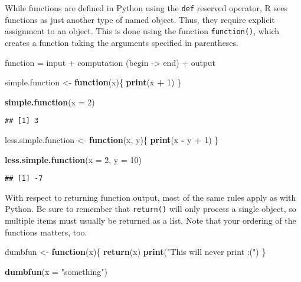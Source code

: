 \documentclass[
]{book}
\newenvironment{Shaded}{\begin{snugshade}}{\end{snugshade}}
\newcommand{\ControlFlowTok}[1]{\textcolor[rgb]{0.13,0.29,0.53}{\textbf{#1}}}
\newcommand{\DataTypeTok}[1]{\textcolor[rgb]{0.13,0.29,0.53}{#1}}
\newcommand{\DecValTok}[1]{\textcolor[rgb]{0.00,0.00,0.81}{#1}}
\newcommand{\KeywordTok}[1]{\textcolor[rgb]{0.13,0.29,0.53}{\textbf{#1}}}
\newcommand{\NormalTok}[1]{#1}
\newcommand{\OperatorTok}[1]{\textcolor[rgb]{0.81,0.36,0.00}{\textbf{#1}}}
\newcommand{\StringTok}[1]{\textcolor[rgb]{0.31,0.60,0.02}{#1}}
\begin{document}
While functions are defined in Python using the \texttt{def} reserved operator, R sees functions as just another type of named object. Thus, they require explicit assignment to an object. This is done using the function \texttt{function()}, which creates a function taking the arguments specified in parentheses.

function = input + computation (begin -\textgreater{} end) + output

\begin{Shaded}
\begin{Highlighting}[]
\NormalTok{simple.function \textless{}{-}}\StringTok{ }\ControlFlowTok{function}\NormalTok{(x)\{}
  \KeywordTok{print}\NormalTok{(x }\OperatorTok{+}\StringTok{ }\DecValTok{1}\NormalTok{)}
\NormalTok{\}}

\KeywordTok{simple.function}\NormalTok{(}\DataTypeTok{x =} \DecValTok{2}\NormalTok{)}
\end{Highlighting}
\end{Shaded}

\begin{verbatim}
## [1] 3
\end{verbatim}

\begin{Shaded}
\begin{Highlighting}[]
\NormalTok{less.simple.function \textless{}{-}}\StringTok{ }\ControlFlowTok{function}\NormalTok{(x, y)\{}
  \KeywordTok{print}\NormalTok{(x }\OperatorTok{{-}}\StringTok{ }\NormalTok{y }\OperatorTok{+}\StringTok{ }\DecValTok{1}\NormalTok{)}
\NormalTok{\}}

\KeywordTok{less.simple.function}\NormalTok{(}\DataTypeTok{x =} \DecValTok{2}\NormalTok{, }\DataTypeTok{y =} \DecValTok{10}\NormalTok{)}
\end{Highlighting}
\end{Shaded}

\begin{verbatim}
## [1] -7
\end{verbatim}

With respect to returning function output, most of the same rules apply as with Python. Be sure to remember that \texttt{return()} will only process a single object, so multiple items must usually be returned as a list. Note that your ordering of the functions matters, too.

\begin{Shaded}
\begin{Highlighting}[]
\NormalTok{dumbfun \textless{}{-}}\StringTok{ }\ControlFlowTok{function}\NormalTok{(x)\{}
  \KeywordTok{return}\NormalTok{(x)}
  \KeywordTok{print}\NormalTok{(}\StringTok{"This will never print :("}\NormalTok{)}
\NormalTok{\}}

\KeywordTok{dumbfun}\NormalTok{(}\DataTypeTok{x =} \StringTok{"something"}\NormalTok{)}
\end{Highlighting}
\end{Shaded}
\end{document}
